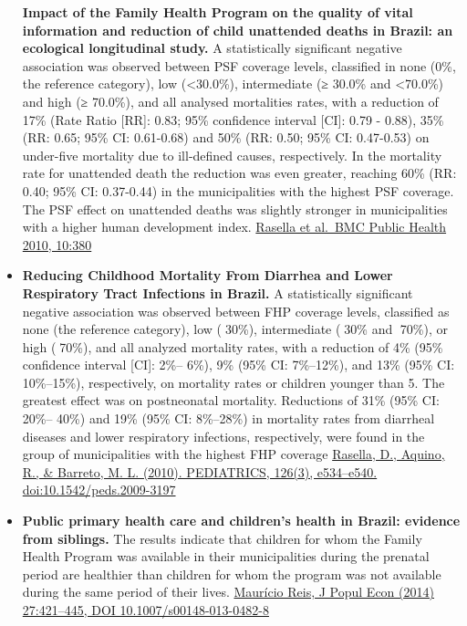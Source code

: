 \documentclass[]{book}
\begin{document}
\begin{itemize}
  \textbf{Impact of the Family Health Program on the quality of vital information and reduction of child unattended deaths in Brazil: an ecological longitudinal study.} A statistically significant negative association was observed between PSF coverage levels, classified in none (0\%, the reference category), low (\textless{}30.0\%), intermediate (≥ 30.0\% and \textless{}70.0\%) and high (≥ 70.0\%), and all analysed mortalities rates, with a reduction of 17\% (Rate Ratio {[}RR{]}: 0.83; 95\% confidence interval {[}CI{]}: 0.79 - 0.88), 35\% (RR: 0.65; 95\% CI: 0.61-0.68) and 50\% (RR: 0.50; 95\% CI: 0.47-0.53) on under-five mortality due to ill-defined causes, respectively. In the mortality rate for unattended death the reduction was even greater, reaching 60\% (RR: 0.40; 95\% CI: 0.37-0.44) in the municipalities with the highest PSF coverage. The PSF effect on unattended deaths was slightly stronger in municipalities with a higher human development index. \href{https://bmcpublichealth.biomedcentral.com/track/pdf/10.1186/1471-2458-10-380}{Rasella et al.~BMC Public Health 2010, 10:380}
\item
  \textbf{Reducing Childhood Mortality From Diarrhea and Lower Respiratory Tract Infections in Brazil.} A statistically significant negative association was observed between FHP coverage levels, classified as none (the reference category), low (30\%), intermediate (30\% and 70\%), or high (70\%), and all analyzed mortality rates, with a reduction of 4\% (95\% confidence interval {[}CI{]}: 2\%-- 6\%), 9\% (95\% CI: 7\%--12\%), and 13\% (95\% CI: 10\%--15\%), respectively, on mortality rates or children younger than 5. The greatest effect was on postneonatal mortality. Reductions of 31\% (95\% CI: 20\%-- 40\%) and 19\% (95\% CI: 8\%--28\%) in mortality rates from diarrheal diseases and lower respiratory infections, respectively, were found in the group of municipalities with the highest FHP coverage \href{https://sci-hub.tw/10.1542/peds.2009-3197}{Rasella, D., Aquino, R., \& Barreto, M. L. (2010). PEDIATRICS, 126(3), e534--e540. doi:10.1542/peds.2009-3197}
\item
  \textbf{Public primary health care and children's health in Brazil: evidence from siblings.} The results indicate that children for whom the Family Health Program was available in their municipalities during the prenatal period are healthier than children for whom the program was not available during the same period of their lives. \href{https://sci-hub.tw/10.1007/s00148-013-0482-8}{Maurício Reis, J Popul Econ (2014) 27:421--445, DOI 10.1007/s00148-013-0482-8}

\end{itemize}
\end{document}
